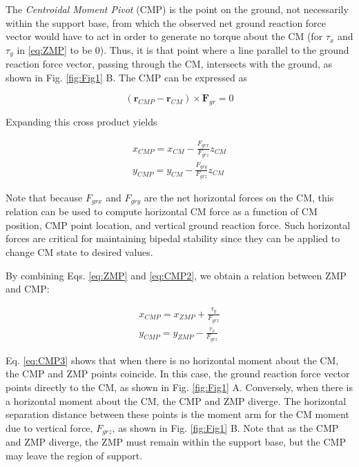 \documentclass{llncs}
\begin{document}
The \textit{Centroidal Moment Pivot} (CMP) is the point on the ground, not necessarily within the support base, from  which the observed net ground reaction 
force vector would have to act in order to generate no torque about the CM (for $\tau_x$ and $\tau_y$ in \ref{eq:ZMP} to be 0).
Thus, it is that point where a line parallel to the ground reaction force vector, passing through the CM, intersects with the ground, 
as shown in Fig. \ref{fig:Fig1} B.  
The CMP can be expressed as

\begin{equation}
\left( \mathbf{r}_{CMP} - \mathbf{r}_{CM} \right) \times \mathbf{F}_{gr} = 0
\label{eq:CMP}
\end{equation}

Expanding this cross product yields

\begin{eqnarray}
x_{CMP} = x_{CM} - \frac{F_{grx}}{F_{grz}} z_{CM}\\
y_{CMP} = y_{CM} - \frac{F_{gry}}{F_{grz}} z_{CM}
\label{eq:CMP2}
\end{eqnarray}

\noindent Note that because $F_{grx}$ and $F_{gry}$ are the net horizontal forces on the CM, this relation can be used to compute horizontal CM force 
as a function of CM position, CMP point location, and vertical ground reaction force.  
Such horizontal forces are critical for maintaining bipedal stability since they can be applied to change CM state to desired values.  

By combining Eqs. \ref{eq:ZMP} and \ref{eq:CMP2}, we obtain a relation between ZMP and CMP:

\begin{eqnarray}
x_{CMP} = x_{ZMP} + \frac{\tau_y}{F_{grz}}\\
y_{CMP} = y_{ZMP} - \frac{\tau_x}{F_{grz}}
\label{eq:CMP3}
\end{eqnarray}

Eq. \ref{eq:CMP3} shows that when there is no horizontal moment about the CM, the CMP and ZMP points coincide.  
In this case, the ground reaction force vector points directly to the CM, as shown in Fig. \ref{fig:Fig1} A.  
Conversely, when there is a horizontal moment about the CM, the CMP and ZMP diverge.  
The horizontal separation distance between these points is the moment arm for the CM moment due to vertical force, $F_{grz}$, as shown in Fig. \ref{fig:Fig1} B.  
Note that as the CMP and ZMP diverge, the ZMP must remain within the support base, but the CMP may leave the region of support. 
\end{document}
